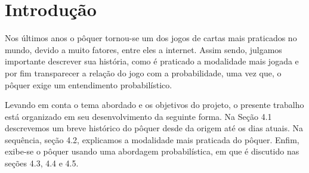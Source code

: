 \documentclass[
	12pt,				%
	oneside,			%
	a4paper,			%
	chapter=TITLE,		%
	section=TITLE,		%
	subsection=Title,	%
	subsubsection=Title,%
	brazil,				%
	]{abntex2}
\begin{document}
\frenchspacing 


\imprimircapa

\imprimirfolhaderosto





\tableofcontents*
\cleardoublepage


\textual

\chapter{Introdução}
Nos últimos anos o pôquer tornou-se um dos jogos de cartas mais praticados no mundo, devido a muito fatores, entre eles a internet. Assim sendo, julgamos importante descrever sua história, como é praticado a modalidade mais jogada e por fim transparecer a relação do jogo com a probabilidade, uma vez que, o pôquer exige um entendimento probabilístico.

Levando em conta o tema abordado e os objetivos do projeto, o presente trabalho está organizado em seu desenvolvimento da seguinte forma. Na Seção 4.1 descrevemos um breve histórico do pôquer desde da origem até os dias atuais. Na sequência, seção 4.2, explicamos a modalidade mais praticada do pôquer. Enfim, exibe-se o pôquer usando uma abordagem probabilística, em que é discutido nas seções 4.3, 4.4 e 4.5.      

\end{document}
